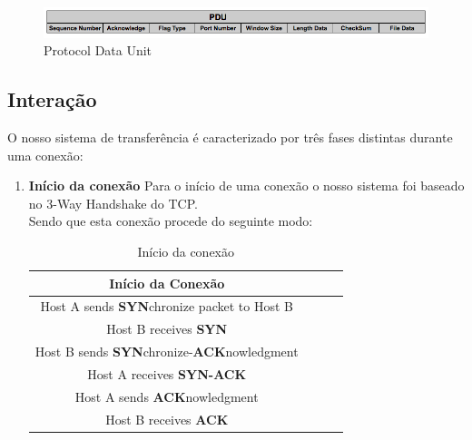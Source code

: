 \documentclass{article}
\begin{document}
\begin{figure}[H]
    \centering
    \includegraphics[scale=0.50]{img/pdu.PNG}
    \caption{Protocol Data Unit}
\end{figure}


\subsection{Interação}

O nosso sistema de transferência é caracterizado por três fases distintas durante uma conexão:
\begin{enumerate}
\item \textbf{Início da conexão}
Para o início de uma conexão o nosso sistema foi baseado no 3-Way Handshake do TCP.\\
Sendo que esta conexão procede do seguinte modo:

\begin{table}[h!]
\centering
\begin{tabular}{||c c c c||} 
\hline
\textbf{Início da Conexão} \\ [0.5ex] 
\hline\hline
Host A sends \textbf{SYN}chronize packet to Host B \\ 
Host B receives  \textbf{SYN}  \\
Host B sends  \textbf{SYN}chronize-\textbf{ACK}nowledgment\\
Host A receives  \textbf{SYN-ACK}\\
Host A sends \textbf{ACK}nowledgment \\
Host B receives \textbf{ACK}\\ 
\hline
\end{tabular}
\caption{Início da conexão}
\label{table:1}
\end{table}



\end{enumerate}
\end{document}
